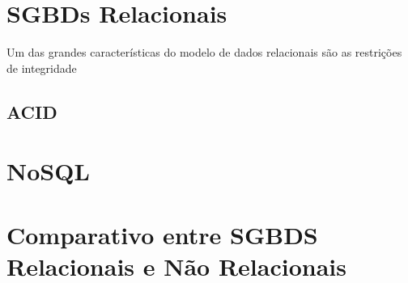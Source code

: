 \section{SGBDs Relacionais}
Um das grandes características do modelo de dados relacionais são as restrições de integridade

\subsection{ACID}

\section{NoSQL}

\section{Comparativo entre SGBDS Relacionais e Não Relacionais}
